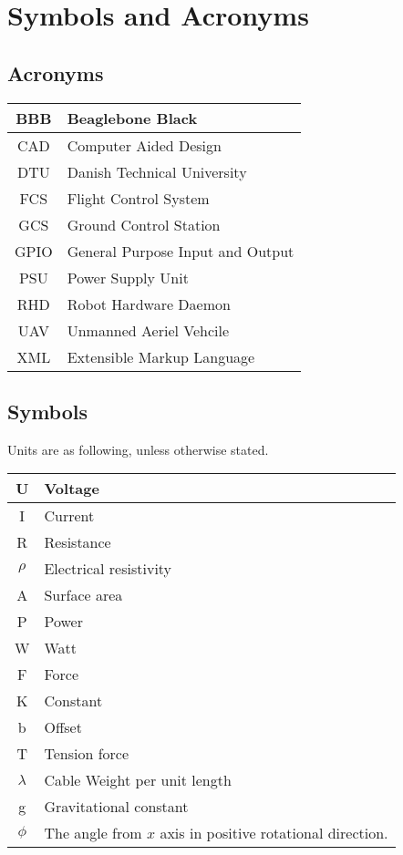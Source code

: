 \chapter{Symbols and Acronyms}
\section{Acronyms}
\begin{center}
\begin{tabular}{|c|l|}
\hline
BBB & Beaglebone Black \\ \hline
CAD & Computer Aided Design \\ \hline
DTU & Danish Technical University\\ \hline
FCS & Flight Control System \\ \hline
GCS & Ground Control Station \\ \hline
GPIO & General Purpose Input and Output\\ \hline
PSU & Power Supply Unit \\ \hline
RHD & Robot Hardware Daemon \\ \hline
UAV & Unmanned Aeriel Vehcile \\ \hline
XML & Extensible Markup Language \\ \hline
\end{tabular}
\end{center}


\section{Symbols}
Units are as following, unless otherwise stated.
\begin{center}
\begin{tabular}{|c|l|}
\hline
U & Voltage \\ \hline
I & Current \\ \hline
R & Resistance \\ \hline
$\rho$ & Electrical resistivity \\ \hline
A & Surface area \\ \hline
P & Power\\ \hline
W & Watt \\ \hline
F & Force \\ \hline
K & Constant \\ \hline
b & Offset \\ \hline
T & Tension force \\ \hline
$\lambda$ & Cable Weight per unit length \\ \hline
g & Gravitational constant \\ \hline
$\phi$ & The angle from $x$ axis in positive rotational direction.\\ \hline
\end{tabular}
\end{center}
